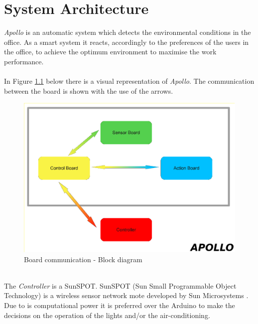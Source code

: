 \documentclass[12pt,a4paper,draft]{report}
\begin{document}
\chapter{System Architecture}
%
\emph{Apollo} is an automatic system which detects the environmental conditions in the office. As a smart system it reacts, accordingly to the preferences of the users in the office, to achieve the optimum environment to maximise the work performance.\\
\ \\
In Figure \ref{arch_design} below there is a visual representation of \emph{Apollo}. The communication between the board is shown with the use of the arrows.\\
%
\begin{figure}[H]
\centering
\includegraphics*[scale=0.35]{architecture_design}
\caption{Board communication - Block diagram}
\label{arch_design}
\end{figure}
\ \\
The \textit{Controller} is a SunSPOT. SunSPOT (Sun Small Programmable Object Technology) is a wireless sensor network mote developed by Sun Microsystems \cite{website:sunspot}. Due to is computational power it is preferred over the Arduino to make the decisions on the operation of the lights and/or the air-conditioning.\label{Controller} \\ 
\ \\
\end{document}
